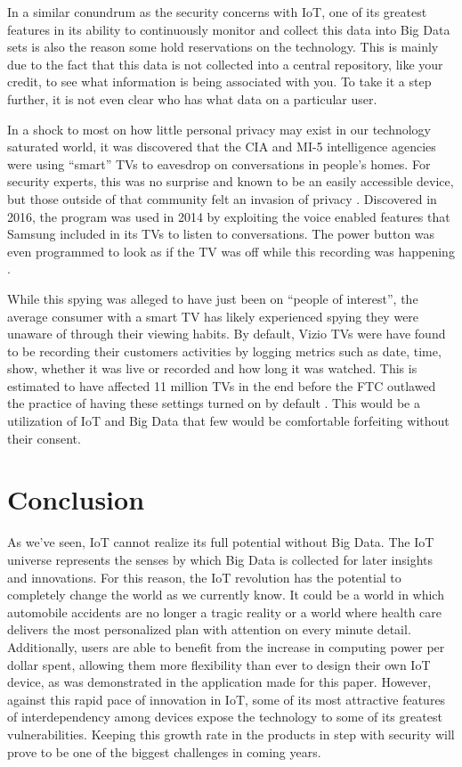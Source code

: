 \documentclass[sigconf]{acmart}
\begin{document}
In a similar conundrum as the security concerns with IoT, one of its greatest features in its ability to continuously monitor and collect this data into Big Data sets is also the reason some hold reservations on the technology. This is mainly due to the fact that this data is not collected into a central repository, like your credit, to see what information is being associated with you. To take it a step further, it is not even clear who has what data on a particular user.

In a shock to most on how little personal privacy may exist in our technology saturated world, it was discovered that the CIA and MI-5 intelligence agencies were using ``smart'' TVs to eavesdrop on conversations in people's homes. For security experts, this was no surprise and known to be an easily accessible device, but those outside of that community felt an invasion of privacy \cite{smarttvdumb}. Discovered in 2016, the program was used in 2014 by exploiting the voice enabled features that Samsung included in its TVs to listen to conversations. The power button was even programmed to look as if the TV was off while this recording was happening \cite{smarttvspy}. 

While this spying was alleged to have just been on ``people of interest'', the average consumer with a smart TV has likely experienced spying they were unaware of through their viewing habits. By default, Vizio TVs were have found to be recording their customers activities by logging metrics such as date, time, show, whether it was live or recorded and how long it was watched. This is estimated to have affected 11 million TVs in the end before the FTC outlawed the practice of having these settings turned on by default \cite{smarttvsettle}. This would be a utilization of IoT and Big Data that few would be comfortable forfeiting without their consent.

\section{Conclusion}
As we've seen, IoT cannot realize its full potential without Big Data. The IoT universe represents the senses by which Big Data is collected for later insights and innovations. For this reason, the IoT revolution has the potential to completely change the world as we currently know. It could be a world in which automobile accidents are no longer a tragic reality or a world where health care delivers the most personalized plan with attention on every minute detail. Additionally, users are able to benefit from the increase in computing power per dollar spent, allowing them more flexibility than ever to design their own IoT device, as was demonstrated in the application made for this paper. However, against this rapid pace of innovation in IoT, some of its most attractive features of interdependency among devices expose the technology to some of its greatest vulnerabilities. Keeping this growth rate in the products in step with security will prove to be one of the biggest challenges in coming years. 
\end{document}
